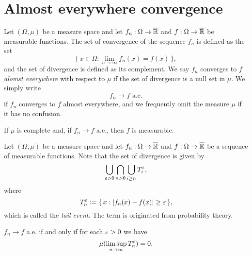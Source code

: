 \documentclass{../note}
\begin{document}
\section{Almost everywhere convergence}

\begin{prb}
Let $(\Omega,\mu)$ be a measure space and let $f_n:\Omega\to\overline{\mathbb{R}}$ and $f:\Omega\to\overline{\mathbb{R}}$ be measurable functions.
The set of convergence of the sequence $f_n$ is defined as the set
\[\{\,x\in\Omega:\lim_{n\to\infty}f_n(x)=f(x)\,\},\]
and the set of divergence is defined as its complement.
We say $f_n$ converges to $f$ \emph{alomst everywhere} with respect to $\mu$ if the set of divergence is a null set in $\mu$.
We simply write
\[f_n\to f\text{ a.e.}\]
if $f_n$ converges to $f$ almost everywhere, and we frequently omit the measure $\mu$ if it has no confusion.
\begin{parts}
\item If $\mu$ is complete and, if $f_n\to f$ a.e., then $f$ is measurable.
\end{parts}
\end{prb}

\begin{prb}
Let $(\Omega,\mu)$ be a measure space and let $f_n:\Omega\to\overline{\mathbb{R}}$ and $f:\Omega\to\overline{\mathbb{R}}$ be a sequence of measurable functions.
Note that the set of divergence is given by
\[\bigcup_{\varepsilon>0}\bigcap_{n>0}\bigcup_{i\ge n}T_i^\varepsilon,\]
where
\[T_n^\varepsilon:=\{\,x:|f_n(x)-f(x)|\ge\varepsilon\,\},\]
which is called the \emph{tail event}.
The term is originated from probability theory.
\begin{parts}
\item $f_n\to f$ a.e. if and only if for each $\varepsilon>0$ we have
\[\mu(\limsup_{n\to\infty}T_n^\varepsilon)=0.\]
\end{parts}
\end{prb}

\begin{prb}

\end{prb}
\end{document}

